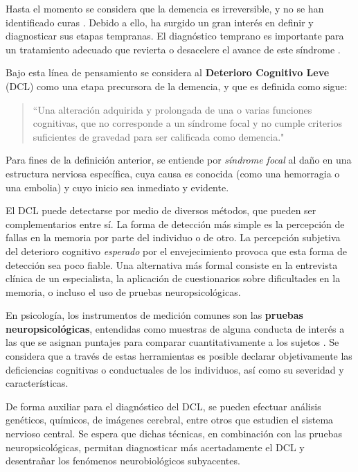 \documentclass[12pt,letterpaper]{book}
\begin{document}
Hasta el momento se considera que la demencia es irreversible, y no se han identificado curas \cite{PlanAlzheimer04}. 
%
Debido a ello, ha surgido un gran interés en definir y diagnosticar sus etapas tempranas. 
%
El diagnóstico temprano es importante para un tratamiento adecuado que revierta o desacelere el avance de este síndrome \cite{Knopman01}.

Bajo esta línea de pensamiento se considera al \textbf{Deterioro Cognitivo Leve} (DCL) como una etapa precursora de la demencia, y que es definida como sigue: 
\begin{quote}
``Una alteración adquirida y prolongada de una o varias funciones cognitivas, que no corresponde a un síndrome focal y no cumple criterios suficientes de gravedad para ser calificada como demencia." \cite{Robles02}
\end{quote}

Para fines de la definición anterior, se entiende por \textit{síndrome focal} al daño en una estructura nerviosa específica, cuya causa es conocida (como una hemorragia o una embolia) y cuyo inicio sea inmediato y evidente. 

El DCL puede detectarse por medio de diversos métodos, que pueden ser complementarios entre sí. 
%
La forma de detección más simple es la percepción de fallas en la memoria por parte del individuo o de otro. 
%
La percepción subjetiva del deterioro cognitivo \textit{esperado} por el envejecimiento provoca que esta forma de detección sea poco fiable.
%
Una alternativa más {formal} consiste en la entrevista clínica de un especialista, la aplicación de cuestionarios sobre dificultades en la memoria, o incluso el uso de pruebas neuropsicológicas. 

En psicología, los instrumentos de medición comunes son las \textbf{pruebas neuropsicológicas}, 
entendidas como muestras de alguna conducta de interés a las que se asignan puntajes para comparar 
cuantitativamente a los sujetos \cite{Ardila12}.
%
Se considera que a través de estas herramientas es posible declarar objetivamente las deficiencias cognitivas o conductuales de los individuos, así como su severidad y características.

De forma auxiliar para el diagnóstico del DCL, se pueden efectuar análisis genéticos, químicos, de imágenes cerebral, entre otros que estudien el sistema nervioso central.
%
Se espera que dichas técnicas, en combinación con las pruebas neuropsicológicas, permitan diagnosticar más acertadamente el DCL y desentrañar los fenómenos neurobiológicos subyacentes.
\end{document}
